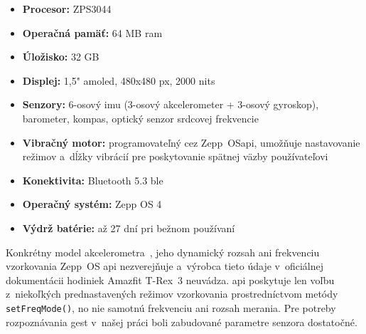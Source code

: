 \begin{itemize}
  \item \textbf{Procesor:} ZPS3044
  \item \textbf{Operačná pamäť:} 64 MB \Gls{ram}
  \item \textbf{Úložisko:} 32 GB
  \item \textbf{Displej:} 1,5" \Gls{amoled}, 480x480 px, 2000 nits
  \item \textbf{Senzory:} 6-osový \Gls{imu} (3-osový
        akcelerometer + 3-osový gyroskop), barometer,
        kompas, optický senzor srdcovej frekvencie
  \item \textbf{Vibračný motor:}
        programovateľný cez Zepp~OS\Gls{api}, umožňuje
        nastavovanie režimov a~dĺžky vibrácií pre poskytovanie
        spätnej väzby používateľovi~\cite{zepp_sensor_vibrator}
  \item \textbf{Konektivita:} Bluetooth 5.3 \Gls{ble}
  \item \textbf{Operačný systém:} Zepp OS 4
  \item \textbf{Výdrž batérie:} až 27 dní pri bežnom
        používaní
\end{itemize}

Konkrétny model akcelerometra~\cite{zepp_sensor_acc}, jeho dynamický rozsah ani
frekvenciu vzorkovania Zepp~OS \Gls{api}
nezverejňuje a~výrobca tieto údaje v~oficiálnej dokumentácii
hodiniek Amazfit T-Rex~3 neuvádza. \Gls{api} poskytuje len
voľbu z~niekoľkých prednastavených režimov vzorkovania
prostredníctvom metódy \texttt{setFreqMode()}, no nie samotnú
frekvenciu ani rozsah merania. Pre potreby rozpoznávania
gest v~našej práci boli zabudované parametre senzora dostatočné.